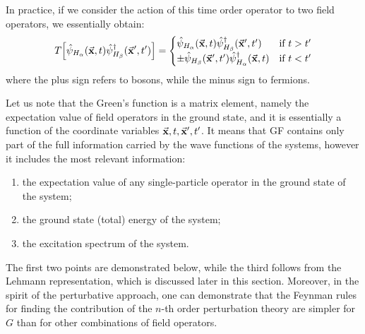 \documentclass[../main/main.tex]{subfiles}
\begin{document}
In practice, if we consider the action of this time order operator to two field operators, we essentially obtain:
\begin{equation*}
  T \qty[ \hat{\psi }_{H_ \alpha } (\va{x},t) \hat{\psi }_{H_ \beta } ^\dag (\va{x}',t')  ] =
  \begin{cases}
   \hat{\psi }_{H_ \alpha } (\va{x},t) \hat{\psi }_{H_ \beta } ^\dag  (\va{x}',t') & \text{if } t>t'  \\
   \pm \hat{\psi }_{H_ \beta } (\va{x}',t') \hat{\psi }_{H_ \alpha } ^\dag  (\va{x},t) & \text{if } t<t'
  \end{cases}
\end{equation*}
where the plus sign refers to bosons, while the minus sign to fermions.

Let us note that the Green's function is a matrix element, namely the expectation value of field operators in the ground state, and it is essentially a function of the coordinate variables \( \va{x}, t, \va{x}', t' \). It means that GF contains only part of the full information carried by the wave functions of the systems, however it includes the most relevant information:
\begin{enumerate}
\item the expectation value of any single-particle operator in the ground state of the system;
\item the ground state (total) energy of the system;
\item the excitation spectrum of the system. 
\end{enumerate}
The first two points are demonstrated below, while the third follows from the Lehmann representation, which is discussed later in this section. 
Moreover, in the spirit of the perturbative approach, one can demonstrate that the Feynman rules for finding the contribution of the \( n \)-th order perturbation theory are simpler for \( G \) than for other combinations of field operators.
\end{document}

